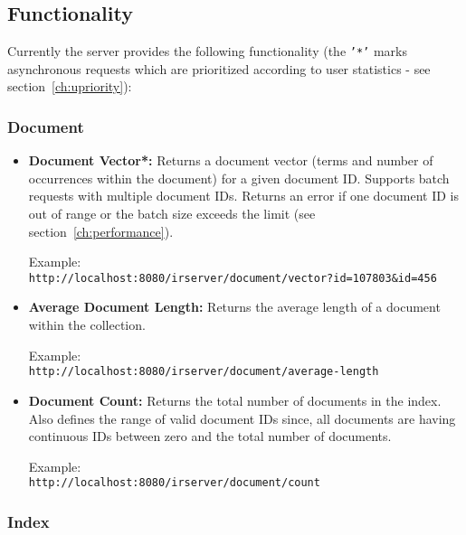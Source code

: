 \documentclass[a4paper,11pt]{article}
\begin{document}
\subsection{Functionality}
Currently the server provides the following functionality (the \texttt{'*'} marks asynchronous requests which are prioritized according to user statistics - see section~\ref{ch:upriority}):

\subsubsection{Document}
\begin{itemize}

\item \textbf{Document Vector*:} Returns a document vector (terms and number of occurrences within the document) for a given document ID. Supports batch requests with multiple document IDs. Returns an error if one document ID is out of range or the batch size exceeds the limit (see section~\ref{ch:performance}).
\begin{leftbar}
Example:\\
\texttt{http://localhost:8080/irserver/document/vector?id=107803\&id=456}
\end{leftbar}

\item \textbf{Average Document Length:} Returns the average length of a document within the collection.
\begin{leftbar}
Example:\\
\texttt{http://localhost:8080/irserver/document/average-length}
\end{leftbar}

\item \textbf{Document Count:} Returns the total number of documents in the index. Also defines the range of valid document IDs since, all documents are having continuous IDs between zero and the total number of documents.
\begin{leftbar}
Example:\\
\texttt{http://localhost:8080/irserver/document/count}
\end{leftbar}
\end{itemize}

\subsubsection{Index}
\end{document}

